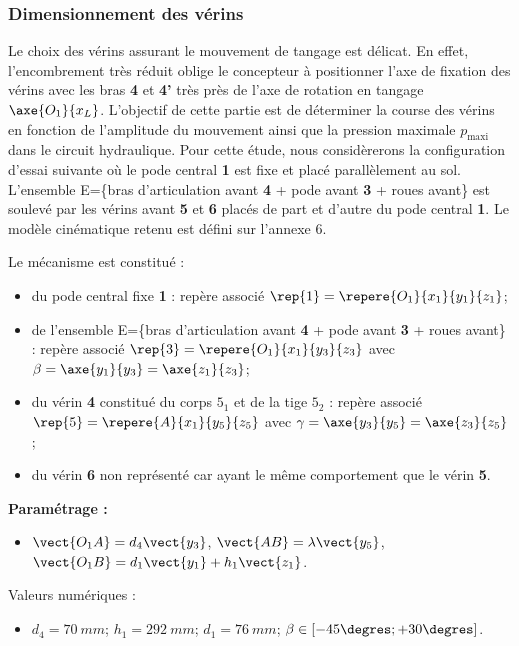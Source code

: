 \subsubsection{Dimensionnement des vérins}
Le choix des vérins assurant le mouvement de tangage est délicat. En effet, l’encombrement très réduit oblige le
concepteur à positionner l’axe de fixation des vérins avec les bras \textbf{4} et \textbf{4’} très près de l’axe de rotation en
tangage $\axe{O_1}{x_L}$. L’objectif de cette partie est de déterminer la course des vérins en fonction de l’amplitude du
mouvement ainsi que la pression maximale $p_{\text{maxi}}$ dans le circuit hydraulique. Pour cette étude, nous considèrerons la
configuration d’essai suivante où le pode central \textbf{1} est fixe et placé parallèlement au sol. L’ensemble E=\{bras
d’articulation avant \textbf{4} + pode avant \textbf{3} + roues avant\} est soulevé par les vérins avant \textbf{5} et \textbf{6} placés de part et d’autre du
pode central \textbf{1}. Le modèle cinématique retenu est défini sur l’annexe 6.

Le mécanisme est constitué : 
\begin{itemize}
 \item du pode central fixe \textbf{1} : repère associé $\rep{1}=\repere{O_1}{x_1}{y_1}{z_1}$;
 \item de l'ensemble  E=\{bras d’articulation avant \textbf{4} + pode avant \textbf{3} + roues avant\} : repère associé $\rep{3}=\repere{O_1}{x_1}{y_3}{z_3}$ avec $\beta = \axe{y_1}{y_3} =\axe{z_1}{z_3}$;
 \item du vérin \textbf{4} constitué du corps \textbf{$5_1$} et de la tige \textbf{$5_2$} : repère associé $\rep{5}=\repere{A}{x_1}{y_5}{z_5}$ avec
  $\gamma = \axe{y_3}{y_5}= \axe{z_3}{z_5}$;
 \item du vérin \textbf{6} non représenté car ayant le même comportement que le vérin \textbf{5}.
\end{itemize}

\textbf{Paramétrage :}
\begin{itemize}
 \item $\vect{O_1 A}=d_4\vect{y_3}$, $\vect{AB}=\lambda\vect{y_5}$, $\vect{O_1 B}=d_1\vect{y_1}+h_1\vect{z_1}$.
\end{itemize}

Valeurs numériques : 
\begin{itemize}
 \item $d_4 =\SI{70}{mm}$; $h_1 =\SI{292}{mm}$; $d_1 =\SI{76}{mm}$; $\beta \in \left[ -45\degres;+30\degres\right]$.
\end{itemize}


